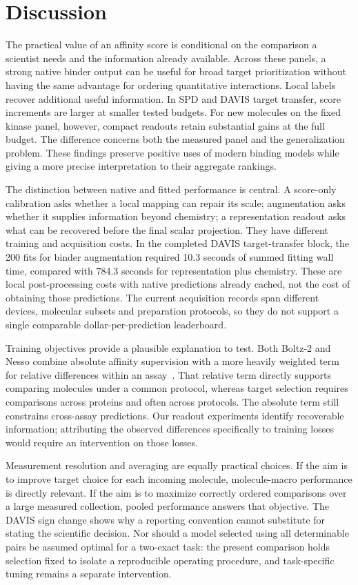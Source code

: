\documentclass[pdflatex, sn-nature]{sn-jnl}
\begin{document}
\section{Discussion}
The practical value of an affinity score is conditional on the comparison a scientist needs and the information already available. Across these panels, a strong native binder output can be useful for broad target prioritization without having the same advantage for ordering quantitative interactions. Local labels recover additional useful information. In SPD and DAVIS target transfer, score increments are larger at smaller tested budgets. For new molecules on the fixed kinase panel, however, compact readouts retain substantial gains at the full budget. The difference concerns both the measured panel and the generalization problem. These findings preserve positive uses of modern binding models while giving a more precise interpretation to their aggregate rankings.

The distinction between native and fitted performance is central. A score-only calibration asks whether a local mapping can repair its scale; augmentation asks whether it supplies information beyond chemistry; a representation readout asks what can be recovered before the final scalar projection. They have different training and acquisition costs. In the completed DAVIS target-transfer block, the 200 fits for binder augmentation required 10.3 seconds of summed fitting wall time, compared with 784.3 seconds for representation plus chemistry. These are local post-processing costs with native predictions already cached, not the cost of obtaining those predictions. The current acquisition records span different devices, molecular subsets and preparation protocols, so they do not support a single comparable dollar-per-prediction leaderboard.

Training objectives provide a plausible explanation to test. Both Boltz-2 and Nesso combine absolute affinity supervision with a more heavily weighted term for relative differences within an assay~\cite{passaro2025boltz2,shenoy2026nesso}. That relative term directly supports comparing molecules under a common protocol, whereas target selection requires comparisons across proteins and often across protocols. The absolute term still constrains cross-assay predictions. Our readout experiments identify recoverable information; attributing the observed differences specifically to training losses would require an intervention on those losses.

Measurement resolution and averaging are equally practical choices. If the aim is to improve target choice for each incoming molecule, molecule-macro performance is directly relevant. If the aim is to maximize correctly ordered comparisons over a large measured collection, pooled performance answers that objective. The DAVIS sign change shows why a reporting convention cannot substitute for stating the scientific decision. Nor should a model selected using all determinable pairs be assumed optimal for a two-exact task: the present comparison holds selection fixed to isolate a reproducible operating procedure, and task-specific tuning remains a separate intervention.
\end{document}
